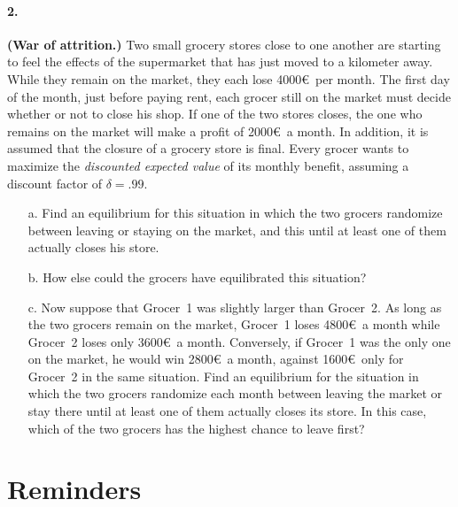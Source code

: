 \documentclass[a4paper,notitlepage,11pt]{article}
\begin{document}
\paragraph{2. } \textbf{(War of attrition.)} Two small grocery stores close to one another are starting to feel the effects of the supermarket that has just moved to a kilometer away. While they remain on the market, they each lose 4000\euro\ per month. The first day of the month, just before paying rent, each grocer still on the market must decide whether or not to close his shop. If one of the two stores closes, the one who remains on the market will make a profit of 2000\euro\ a month. In addition, it is assumed that the closure of a grocery store is final. Every grocer wants to maximize the \emph{discounted expected value} of its monthly benefit, assuming a discount factor of $\delta = .99$.
\begin{enumerate}
	\item[a.] Find an equilibrium for this situation in which the two grocers randomize between leaving or staying on the market, and this until at least one of them actually closes his store.
	\item[b.] How else could the grocers have equilibrated this situation?
	\item[c.] Now suppose that Grocer~1 was slightly larger than Grocer~2. As long as the two grocers remain on the market, Grocer~1 loses 4800\euro\ a month while Grocer~2 loses only 3600\euro\ a month. Conversely, if Grocer~1 was the only one on the market, he would win 2800\euro\ a month, against 1600\euro\ only for Grocer~2 in the same situation. Find an equilibrium for the situation in which the two grocers randomize each month between leaving the market or stay there until at least one of them actually closes its store. In this case, which of the two grocers has the highest chance to leave first?
\end{enumerate}


\newpage

\section*{Reminders}
\end{document}
